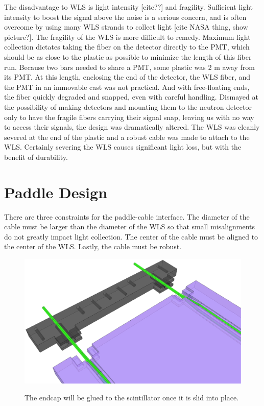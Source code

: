 The disadvantage to WLS is light intensity [cite??] and fragility.  Sufficient light intensity to boost the signal above the noise is a serious concern, and is often overcome by using many WLS strands to collect light [cite NASA thing, show picture?].  The fragility of the WLS is more difficult to remedy.  Maximum light collection dictates taking the fiber on the detector directly to the PMT, which should be as close to the plastic as possible to minimize the length of this fiber run.  Because two bars needed to share a PMT, some plastic was 2 m away from its PMT.  At this length, enclosing the end of the detector, the WLS fiber, and the PMT in an immovable cast was not practical.  And with free-floating ends, the fiber quickly degraded and snapped, even with careful handling.  Dismayed at the possibility of making detectors and mounting them to the neutron detector only to have the fragile fibers carrying their signal snap, leaving us with no way to access their signals, the design was dramatically altered.  The WLS was cleanly severed at the end of the plastic and a robust cable was made to attach to the WLS.  Certainly severing the WLS causes significant light loss, but with the benefit of durability.  

\section{Paddle Design}

There are three constraints for the paddle-cable interface.  The diameter of the cable must be larger than the diameter of the WLS so that small misalignments do not greatly impact light collection.  The center of the cable must be aligned to the center of the WLS.  Lastly, the cable must be robust.

\begin{figure}[ht]
\centering
\includegraphics[width=1.0\textwidth]{figures/veto_assembly.eps}
\label{fig:paddleAssembly}
\caption{The endcap will be glued to the scintillator once it is slid into place.}
\end{figure}


